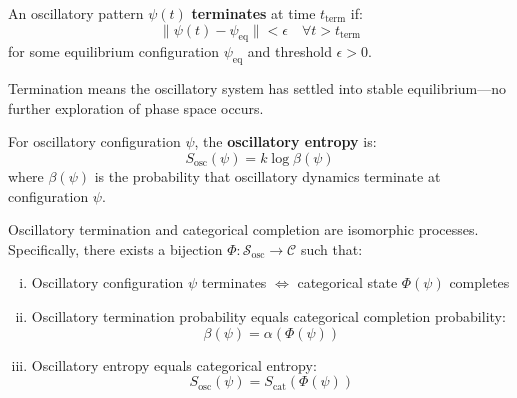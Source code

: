 \begin{definition}
\label{def:oscillatory_termination}
An oscillatory pattern $\psi(t)$ \textbf{terminates} at time $t_{\text{term}}$ if:
\begin{equation}
\|\psi(t) - \psi_{\text{eq}}\| < \epsilon \quad \forall t > t_{\text{term}}
\end{equation}
for some equilibrium configuration $\psi_{\text{eq}}$ and threshold $\epsilon > 0$.
\end{definition}

Termination means the oscillatory system has settled into stable equilibrium—no further exploration of phase space occurs.

\begin{definition}
\label{def:oscillatory_entropy}
For oscillatory configuration $\psi$, the \textbf{oscillatory entropy} is:
\begin{equation}
S_{\text{osc}}(\psi) = k \log \beta(\psi)
\label{eq:oscillatory_entropy}
\end{equation}
where $\beta(\psi)$ is the probability that oscillatory dynamics terminate at configuration $\psi$.
\end{definition}

\begin{theorem}
\label{thm:oscillatory_categorical_equivalence}
Oscillatory termination and categorical completion are isomorphic processes. Specifically, there exists a bijection $\Phi: \mathcal{S}_{\text{osc}} \to \mathcal{C}$ such that:
\begin{enumerate}[(i)]
\item Oscillatory configuration $\psi$ terminates $\iff$ categorical state $\Phi(\psi)$ completes
\item Oscillatory termination probability equals categorical completion probability:
\begin{equation}
\beta(\psi) = \alpha(\Phi(\psi))
\end{equation}
\item Oscillatory entropy equals categorical entropy:
\begin{equation}
S_{\text{osc}}(\psi) = S_{\text{cat}}(\Phi(\psi))
\end{equation}
\end{enumerate}
\end{theorem}

